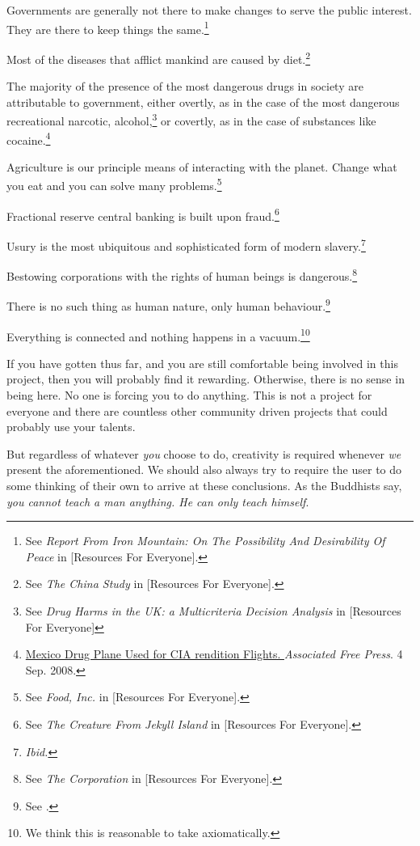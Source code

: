 \item
Governments are generally not there to make changes to serve the public interest. They are there to keep things the same.\footnote{See {\it Report From Iron Mountain: On The Possibility And Desirability Of Peace} in [Resources For Everyone].}

\item
Most of the diseases that afflict mankind are caused by diet.\footnote{See {\it The China Study} in [Resources For Everyone].}

\item
The majority of the presence of the most dangerous drugs in society are attributable to government, either overtly, as in the case of the most dangerous recreational narcotic, alcohol,\footnote{See {\it Drug Harms in the UK: a Multicriteria Decision Analysis} in [Resources For Everyone]} or covertly, as in the case of substances like cocaine.\footnote{\href{http://afp.google.com/article/ALeqM5j6QonBKKMo2gw1e3ql-xUcQEZbVg}{Mexico Drug Plane Used for CIA rendition Flights. }{\it Associated Free Press}. 4 Sep. 2008.}

\item
Agriculture is our principle means of interacting with the planet. Change what you eat and you can solve many problems.\footnote{See {\it Food, Inc.} in [Resources For Everyone].}

\item
Fractional reserve central banking is built upon fraud.\footnote{See {\it The Creature From Jekyll Island} in [Resources For Everyone].}

\item
Usury is the most ubiquitous and sophisticated form of modern slavery.\footnote{{\it Ibid.}}

\item
Bestowing corporations with the rights of human beings is dangerous.\footnote{See {\it The Corporation} in [Resources For Everyone].}

\item
There is no such thing as human nature, only human behaviour.\footnote{See .}

\item
Everything is connected and nothing happens in a vacuum.\footnote{We think this is reasonable to take axiomatically.}
\stopitemize

If you have gotten thus far, and you are still comfortable being involved in this project, then you will probably find it rewarding. Otherwise, there is no sense in being here. No one is forcing you to do anything. This is not a project for everyone and there are countless other community driven projects that could probably use your talents.

But regardless of whatever {\it you} choose to do, creativity is required whenever {\it we} present the aforementioned. We should also always try to require the user to do some thinking of their own to arrive at these conclusions. As the Buddhists say, {\it you cannot teach a man anything. He can only teach himself}.

